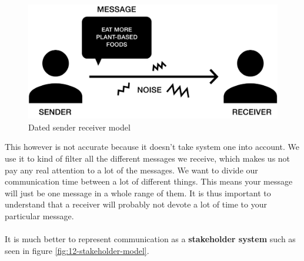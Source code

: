 \documentclass[../summary.tex]{subfiles}
\begin{document}
			\begin{figure}[h]
				\centering
				\includegraphics[width=0.7\linewidth]{../images/12-sender-receiver-model.png}
				\caption{Dated sender receiver model}
				\label{fig:12-sender-receiver-model}
			\end{figure}
			This however is not accurate because it doesn't take system one into account. We use it to kind of filter all the different messages we receive, which makes us not pay any real attention to a lot of the messages. We want to divide our communication time between a lot of different things. This means your message will just be one message in a whole range of them. It is thus important to understand that a receiver will probably not devote a lot of time to your particular message. \\
			\\
			It is much better to represent communication as a \textbf{stakeholder system} such as seen in figure \ref{fig:12-stakeholder-model}. \\
			
\end{document}
